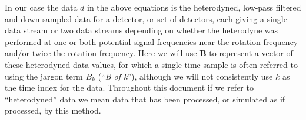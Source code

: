 In our case the data $d$ in the above equations is the heterodyned, low-pass filtered and down-sampled data
for a detector, or set of detectors, each giving a single data stream or two data streams depending on
whether the heterodyne was performed at one or both potential signal frequencies near the rotation frequency
and/or twice the rotation frequency. Here we will use $\mathbf{B}$ to represent a vector of these heterodyned
data values, for which a single time sample is often referred to using the jargon term $B_k$ (``{\it B of k}''), although we will
not consistently use $k$ as the time index for the data. Throughout this document if we refer to ``heterodyned'' data we mean
data that has been processed, or simulated as if processed, by this method.
